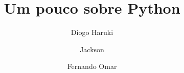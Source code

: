 \documentclass[brazil]{beamer}
\title{Um pouco sobre Python}
\author{Diogo Haruki \and Jackson \and Fernando Omar}
\date{}
\begin{document}
\frame{\titlepage}


\end{document}
